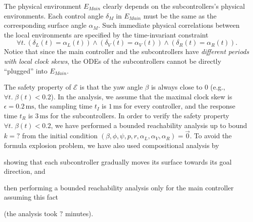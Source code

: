 The physical environment $E_\mathit{Main}$ clearly depends on the subcontrollers's physical environments.
Each control angle $\delta_M$ in  $E_\mathit{Main}$ must be the same as the corresponding surface angle $\alpha_M$.
%
Such  immediate physical correlations between the local %
environments are specified by the time-invariant constraint
%
\[\forall t.\, (\delta_L(t) = \alpha_L(t)) \wedge (\delta_V(t) = \alpha_V(t)) \wedge (\delta_R(t) = \alpha_R(t)).
\]
Notice that since the main controller and the subcontrollers have \emph{different periods with local clock skews},
the ODEs of the subcontrollers cannot be directly ``plugged'' into $E_\mathit{Main}$.

The safety property of $\mathcal{E}$ 
is that the yaw angle $\beta$ is always close to $0$ (e.g., $\forall t.\; \beta(t) < 0.2$).
%
In the analysis,
we assume that the maximal clock skew is $\epsilon = 0.2\,\mathrm{ms}$,
the sampling time $t_I$ is $1\,\mathrm{ms}$ for every controller,
and the response time $t_R$ is $3\,\mathrm{ms}$ for the subcontrollers.
%
In order to verify the safety property $\forall t.\; \beta(t) < 0.2$,
we have performed a bounded reachability analysis 
up to bound $k = \textbf{?}$ from the initial condition 
$(\beta, \phi, \psi, p, r, \alpha_L, \alpha_V, \alpha_R) = \vec{0}$.
%
To avoid the formula explosion problem, 
we have also used compositional analysis by 
\begin{inparaenum}[(i)]
	\item showing that each subcontroller gradually moves its surface towards its goal direction, and 
	\item then performing a bounded reachability analysis only for the main controller assuming this fact
\end{inparaenum}
(the analysis took $\textbf{?}$ minutes).





